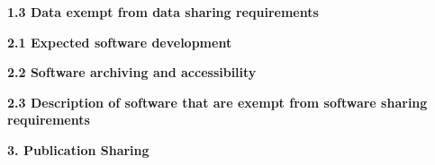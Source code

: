\documentclass[12pt]{article}
\newcommand{\paragraphskip}{\medskip}
\renewcommand{\paragraph}[1]{\par\paragraphskip\noindent\textbf{#1}}
\begin{document}
\paragraph{1.3 Data exempt from data sharing requirements}

\paragraph{2.1 Expected software development}

\paragraph{2.2 Software archiving and accessibility}

\paragraph{2.3 Description of software that are exempt from software sharing requirements}

\paragraph{3. Publication Sharing}
\end{document}
